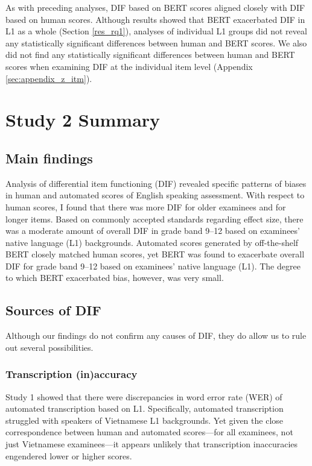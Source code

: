 \documentclass [PhD] {uclathes}
\begin{document}
As with preceding analyses, DIF based on BERT scores aligned closely with DIF based on human scores. Although results showed that BERT exacerbated DIF in L1 as a whole (Section \ref{res_rq1}), analyses of individual L1 groups did not reveal any statistically significant differences between human and BERT scores. We also did not find any statistically significant differences between human and BERT scores when examining DIF at the individual item level (Appendix \ref{sec:appendix_z_itm}). 

\section{Study 2 Summary}

\subsection{Main findings}

Analysis of differential item functioning (DIF) revealed specific patterns of biases in human and automated scores of English speaking assessment. With respect to human scores, I found that there was more DIF for older examinees and for longer items. Based on commonly accepted standards regarding effect size, there was a moderate amount of overall DIF in grade band 9–12 based on examinees’ native language (L1) backgrounds. Automated scores generated by off-the-shelf BERT closely matched human scores, yet BERT was found to exacerbate overall DIF for grade band 9–12 based on examinees’ native language (L1). The degree to which BERT exacerbated bias, however, was very small.

\subsection{Sources of DIF}

Although our findings do not confirm any causes of DIF, they do allow us to rule out several possibilities. 

\subsubsection{Transcription (in)accuracy}

Study 1 showed that there were discrepancies in word error rate (WER) of automated transcription based on L1. Specifically, automated transcription struggled with speakers of Vietnamese L1 backgrounds. Yet given the close correspondence between human and automated scores—for all examinees, not just Vietnamese examinees—it appears unlikely that transcription inaccuracies engendered lower or higher scores. 
\end{document}
